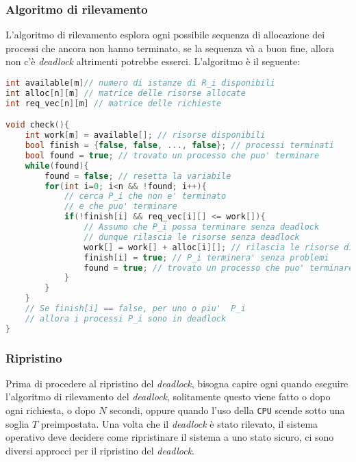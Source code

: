         \subsubsection{Algoritmo di rilevamento}
            L'algoritmo di rilevamento esplora ogni possibile sequenza di allocazione dei processi che ancora non hanno terminato, se la sequenza và a buon fine, allora non c'è \textit{deadlock} altrimenti potrebbe esserci.\newline
            L'algoritmo è il seguente:
            \begin{lstlisting}[language=C++, caption={Algoritmo di rilevamento}, label={lst:detect}, basicstyle=\small]
int available[m]// numero di istanze di R_i disponibili
int alloc[n][m] // matrice delle risorse allocate
int req_vec[n][m] // matrice delle richieste

void check(){
    int work[m] = available[]; // risorse disponibili
    bool finish = {false, false, ..., false}; // processi terminati
    bool found = true; // trovato un processo che puo' terminare
    while(found){
        found = false; // resetta la variabile
        for(int i=0; i<n && !found; i++){
            // cerca P_i che non e' terminato
            // e che puo' terminare
            if(!finish[i] && req_vec[i][] <= work[]){
                // Assumo che P_i possa terminare senza deadlock
                // dunque rilascia le risorse senza deadlock
                work[] = work[] + alloc[i][]; // rilascia le risorse di P_i
                finish[i] = true; // P_i terminera' senza problemi
                found = true; // trovato un processo che puo' terminare
            }
        }
    }
    // Se finish[i] == false, per uno o piu'  P_i
    // allora i processi P_i sono in deadlock
}
            \end{lstlisting}
        \subsubsection{Ripristino}
            Prima di procedere al ripristino del \textit{deadlock}, bisogna capire ogni quando eseguire l'algoritmo di rilevamento del \textit{deadlock}, solitamente questo viene fatto o dopo ogni richiesta, o dopo $N$ secondi, oppure quando l'uso della \texttt{CPU} scende sotto una soglia $T$ preimpostata. \newline
            Una volta che il \textit{deadlock} è stato rilevato, il sistema operativo deve decidere come ripristinare il sistema a uno stato sicuro, ci sono diversi approcci per il ripristino del \textit{deadlock}.
